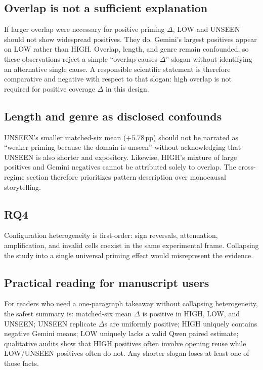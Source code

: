 \subsection{Overlap is not a sufficient explanation}
If larger overlap were necessary for positive priming $\Delta$, LOW and UNSEEN should not show widespread positives.
They do.
Gemini's largest positives appear on LOW rather than HIGH.
Overlap, length, and genre remain confounded, so these observations reject a simple ``overlap causes $\Delta$'' slogan without identifying an alternative single cause.
A responsible scientific statement is therefore comparative and negative with respect to that slogan: high overlap is not required for positive coverage $\Delta$ in this design.

\subsection{Length and genre as disclosed confounds}
UNSEEN's smaller matched-six mean ($+5.78$\,pp) should not be narrated as ``weaker priming because the domain is unseen'' without acknowledging that UNSEEN is also shorter and expository.
Likewise, HIGH's mixture of large positives and Gemini negatives cannot be attributed solely to overlap.
The cross-regime section therefore prioritizes pattern description over monocausal storytelling.

\subsection{RQ4}
Configuration heterogeneity is first-order: sign reversals, attenuation, amplification, and invalid cells coexist in the same experimental frame.
Collapsing the study into a single universal priming effect would misrepresent the evidence.

\subsection{Practical reading for manuscript users}
For readers who need a one-paragraph takeaway without collapsing heterogeneity, the safest summary is:
matched-six mean $\Delta$ is positive in HIGH, LOW, and UNSEEN; UNSEEN replicate $\Delta$s are uniformly positive; HIGH uniquely contains negative Gemini means; LOW uniquely lacks a valid Qwen paired estimate; qualitative audits show that HIGH positives often involve opening reuse while LOW/UNSEEN positives often do not.
Any shorter slogan loses at least one of those facts.
